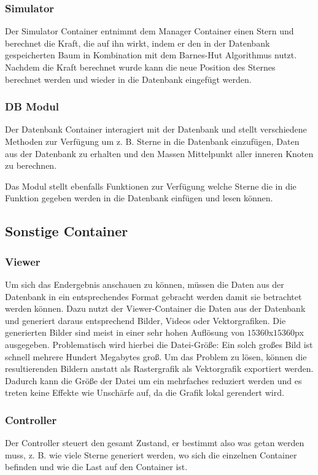 \subsubsection{Simulator}
Der Simulator Container entnimmt dem Manager Container einen Stern und
berechnet die Kraft, die auf ihn wirkt, indem er den in der Datenbank
gespeicherten Baum in Kombination mit dem Barnes-Hut Algorithmus nutzt. Nachdem die
Kraft berechnet wurde kann die neue Position des Sternes berechnet werden und
wieder in die Datenbank eingefügt werden.

\subsubsection{DB Modul} \label{subsubsec:db_modul}
Der Datenbank Container interagiert mit der Datenbank und stellt verschiedene
Methoden zur Verfügung um z. B. Sterne in die Datenbank einzufügen, Daten aus
der Datenbank zu erhalten und den Massen Mittelpunkt aller inneren Knoten zu
berechnen.

\par Das Modul stellt ebenfalls Funktionen zur Verfügung welche Sterne die in
die Funktion gegeben werden in die Datenbank einfügen und lesen können.

\subsection{Sonstige Container}

\subsubsection{Viewer}
Um sich das Endergebnis anschauen zu können, müssen die Daten aus der Datenbank
in ein entsprechendes Format gebracht werden damit sie betrachtet werden
können. Dazu nutzt der Viewer-Container die Daten aus der Datenbank und
generiert daraus entsprechend Bilder, Videos oder Vektorgrafiken. Die
generierten Bilder sind meist in einer sehr hohen Auflösung von
\(15360\)x\(15360\)px ausgegeben. Problematisch wird hierbei die Datei-Größe:
Ein solch großes Bild ist schnell mehrere Hundert Megabytes groß. Um das
Problem zu lösen, können die resultierenden Bildern anstatt als Rastergrafik
als Vektorgrafik exportiert werden. Dadurch kann die Größe der Datei um ein
mehrfaches reduziert werden und es treten keine Effekte wie Unschärfe auf, da
die Grafik lokal gerendert wird.

\subsubsection{Controller}
Der Controller steuert den gesamt Zustand, er bestimmt also was getan werden
muss, z. B. wie viele Sterne generiert werden, wo sich die einzelnen Container
befinden und wie die Last auf den Container ist.

